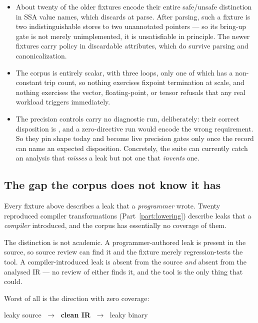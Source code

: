 \begin{itemize}[nosep,leftmargin=1.4em]
\item About twenty of the older fixtures encode their entire safe/unsafe
      distinction in SSA value names, which  discards at parse.
      After parsing, such a fixture is two indistinguishable stores to two
      unannotated pointers --- so its bring-up gate is not merely unimplemented,
      it is unsatisfiable in principle. The newer fixtures carry policy in
      discardable attributes, which do survive parsing and canonicalization.
\item The corpus is entirely scalar, with three loops, only one of which has a
      non-constant trip count, so nothing exercises
      fixpoint termination at scale, and nothing exercises the vector,
      floating-point, or tensor refusals that any real workload triggers
      immediately.
\item The precision controls carry no diagnostic run, deliberately: their correct
      disposition is \RelReq{}, and a zero-directive run would encode the wrong
      requirement. So they pin shape today and become live precision gates only
      once the record can name an expected disposition. Concretely, the suite
      can currently catch an analysis that \emph{misses} a leak but not one that
      \emph{invents} one.
\end{itemize}

\subsection{The gap the corpus does not know it has}
\label{sec:compilergap}

Every fixture above describes a leak that a \emph{programmer} wrote. Twenty
reproduced compiler transformations (Part~\ref{part:lowering}) describe leaks
that a \emph{compiler} introduced, and the corpus has essentially no coverage of
them.

The distinction is not academic. A programmer-authored leak is present in the
source, so source review can find it and the fixture merely regression-tests the
tool. A compiler-introduced leak is absent from the source \emph{and} absent
from the analysed IR --- no review of either finds it, and the tool is the only
thing that could.

Worst of all is the direction with zero coverage:

\begin{center}
leaky source $\;\longrightarrow\;$ \textbf{clean  IR} $\;\longrightarrow\;$ leaky binary
\end{center}

